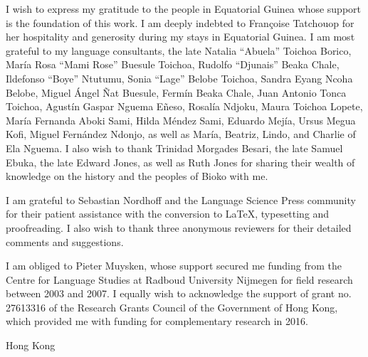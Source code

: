 
I wish to express my gratitude to the people in Equatorial Guinea whose support is the foundation of this work. I am deeply indebted to Françoise Tatchouop for her hospitality and generosity during my stays in Equatorial Guinea. I am most grateful to my language consultants, the late Natalia “Abuela” Toichoa Borico, María Rosa “Mami Rose” Buesule Toichoa, Rudolfo “Djunais” Beaka Chale, Ildefonso “Boye” Ntutumu, Sonia “Lage” Belobe Toichoa, Sandra Eyang Ncoha Belobe, Miguel Ángel Ñat Buesule, Fermín Beaka Chale, Juan Antonio Tonca Toichoa, Agustín Gaspar Nguema Eñeso, Rosalía Ndjoku, Maura Toichoa Lopete, María Fernanda Aboki Sami, Hilda Méndez Sami, Eduardo Mejía, Ursus Megua Kofi, Miguel Fernández Ndonjo, as well as María, Beatriz, Lindo, and Charlie of Ela Nguema. I also wish to thank Trinidad Morgades Besari, the late Samuel Ebuka, the late Edward Jones, as well as Ruth Jones for sharing their wealth of knowledge on the history and the peoples of Bioko with me.


I am grateful to Sebastian Nordhoff and the Language Science Press community for their patient assistance with the conversion to LaTeX, typesetting and proofreading. I also wish to thank three anonymous reviewers for their detailed comments and suggestions. 



I am obliged to Pieter Muysken, whose support secured me funding from the Centre for Language Studies at Radboud University Nijmegen for field research between 2003 and 2007. I equally wish to acknowledge the support of grant no. 27613316 of the Research Grants Council of the Government of Hong Kong, which provided me with funding for complementary research in 2016.


\citealt{February2018}

Hong Kong
